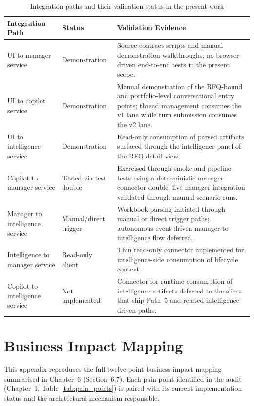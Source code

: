 \begin{table}[H]
\centering
\renewcommand{\arraystretch}{1.4}
\begin{tabularx}{\textwidth}{|p{3.8cm}|p{2.8cm}|>{\RaggedRight\arraybackslash}X|}
\hline
\rowcolor{lightgray}
\textbf{Integration Path} & \textbf{Status} & \textbf{Validation Evidence} \\ \hline
UI to manager service & Demonstration & Source-contract scripts and manual demonstration walkthroughs; no browser-driven end-to-end tests in the present scope. \\ \hline
UI to copilot service & Demonstration & Manual demonstration of the RFQ-bound and portfolio-level conversational entry points; thread management consumes the v1 lane while turn submission consumes the v2 lane. \\ \hline
UI to intelligence service & Demonstration & Read-only consumption of parsed artifacts surfaced through the intelligence panel of the RFQ detail view. \\ \hline
Copilot to manager service & Tested via test double & Exercised through smoke and pipeline tests using a deterministic manager connector double; live manager integration validated through manual scenario runs. \\ \hline
Manager to intelligence service & Manual/direct trigger & Workbook parsing initiated through manual or direct trigger paths; autonomous event-driven manager-to-intelligence flow deferred. \\ \hline
Intelligence to manager service & Read-only client & Thin read-only connector implemented for intelligence-side consumption of lifecycle context. \\ \hline
Copilot to intelligence service & Not implemented & Connector for runtime consumption of intelligence artifacts deferred to the slices that ship Path~5 and related intelligence-driven paths. \\ \hline
\end{tabularx}
\caption{Integration paths and their validation status in the present work}
\label{tab:integration}
\end{table}

\section{Business Impact Mapping}
\label{app:business-impact}

This appendix reproduces the full twelve-point business-impact mapping summarised in Chapter~6 (Section~6.7). Each pain point identified in the audit (Chapter~1, Table~\ref{tab:pain_points}) is paired with its current implementation status and the architectural mechanism responsible.

